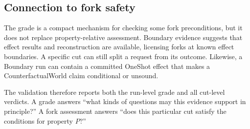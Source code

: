 \subsection{Connection to fork safety}

The grade is a compact mechanism for checking some fork preconditions, but it
does not replace property-relative assessment.  Boundary evidence suggests
that effect results and reconstruction are available, licensing forks at known
effect boundaries.  A specific cut can still split a request from its outcome.
Likewise, a Boundary run can contain a committed OneShot effect that makes a
CounterfactualWorld claim conditional or unsound.

The validation therefore reports both the run-level grade and all cut-level
verdicts.  A grade answers ``what kinds of questions may this evidence support
in principle?''  A fork assessment answers ``does this particular cut satisfy
the conditions for property $P$?''
